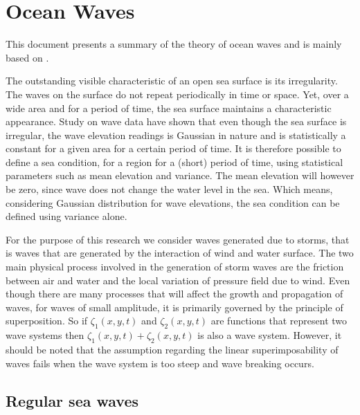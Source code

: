\section{Ocean Waves} 
This document presents a summary of the theory of ocean waves and is mainly 
based on \cite{lewis1988principles}.

The outstanding visible characteristic of an open sea surface is its
irregularity. The waves on the surface do not repeat periodically in time or
space. Yet, over a wide area and for a period of time, the sea surface maintains
a characteristic appearance. Study on wave data have shown that even though the
sea surface is irregular, the wave elevation readings is Gaussian in nature and
is statistically a constant for a given area for a certain period of time. It is
therefore possible to define a sea condition, for a region for a (short) period
of time, using statistical parameters such as mean elevation and variance. The
mean elevation will however be zero, since wave does not change the water level
in the sea. Which means, considering Gaussian distribution for wave elevations,
the sea condition can be defined using variance alone.

For the purpose of this research we consider waves generated due to storms, that
is waves that are generated by the interaction of wind and water surface. The
two main physical process involved in the generation of storm waves are the
friction between air and water and the local variation of pressure field due to
wind. Even though there are many processes that will affect the growth and
propagation of waves, for waves of small amplitude, it is primarily governed by
the principle of superposition. So if $\zeta_1(x,y,t)$ and $\zeta_2(x,y,t)$ are
functions that represent two wave systems then $\zeta_1(x,y,t) + \zeta_2(x,y,t)$
is also a wave system.  However, it should be noted that the assumption
regarding the linear superimposability of waves fails when the wave system is
too steep and wave breaking occurs.

\subsection{Regular sea waves}

